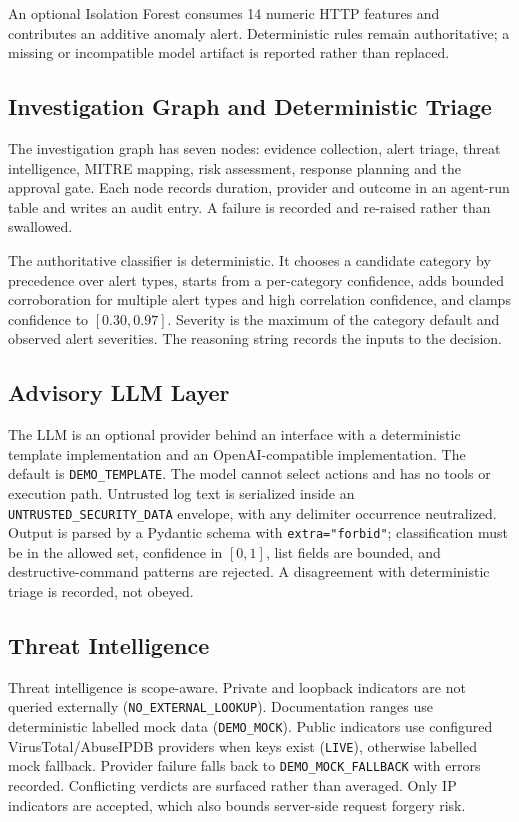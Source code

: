 \documentclass[10pt,twocolumn]{article}
\begin{document}
An optional Isolation Forest consumes 14 numeric HTTP features and contributes an additive anomaly alert. Deterministic rules remain authoritative; a missing or incompatible model artifact is reported rather than replaced.

\subsection{Investigation Graph and Deterministic Triage}

The investigation graph has seven nodes: evidence collection, alert triage, threat intelligence, MITRE mapping, risk assessment, response planning and the approval gate. Each node records duration, provider and outcome in an agent-run table and writes an audit entry. A failure is recorded and re-raised rather than swallowed.

The authoritative classifier is deterministic. It chooses a candidate category by precedence over alert types, starts from a per-category confidence, adds bounded corroboration for multiple alert types and high correlation confidence, and clamps confidence to $[0.30, 0.97]$. Severity is the maximum of the category default and observed alert severities. The reasoning string records the inputs to the decision.

\subsection{Advisory LLM Layer}

The LLM is an optional provider behind an interface with a deterministic template implementation and an OpenAI-compatible implementation. The default is \texttt{DEMO\_TEMPLATE}. The model cannot select actions and has no tools or execution path. Untrusted log text is serialized inside an \texttt{UNTRUSTED\_SECURITY\_DATA} envelope, with any delimiter occurrence neutralized. Output is parsed by a Pydantic schema with \texttt{extra="forbid"}; classification must be in the allowed set, confidence in $[0,1]$, list fields are bounded, and destructive-command patterns are rejected. A disagreement with deterministic triage is recorded, not obeyed.

\subsection{Threat Intelligence}

Threat intelligence is scope-aware. Private and loopback indicators are not queried externally (\texttt{NO\_EXTERNAL\_LOOKUP}). Documentation ranges use deterministic labelled mock data (\texttt{DEMO\_MOCK}). Public indicators use configured VirusTotal/AbuseIPDB providers when keys exist (\texttt{LIVE}), otherwise labelled mock fallback. Provider failure falls back to \texttt{DEMO\_MOCK\_FALLBACK} with errors recorded. Conflicting verdicts are surfaced rather than averaged. Only IP indicators are accepted, which also bounds server-side request forgery risk.
\end{document}
